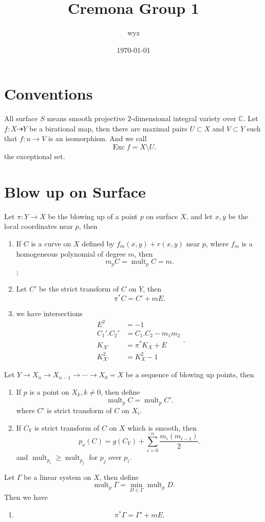 \documentclass{article}
\title{Cremona Group 1}
\author{wyz}
\date{\today}
\begin{document}
  \maketitle
\section{Conventions}
All surface $S$ means smooth projective $2$-dimensional integral variety over $\mathbb{C}$. Let $f:X\dashrightarrow Y$ be a birational map, then there are maximal pairs $U\subset X $ and $V \subset Y$ such that $f:u\to V$ is an isomorphism. And we call
\[
  \operatorname{Exc}f=X\setminus U
.\]
the exceptional set.

\section{Blow up on Surface}
Let $\pi :Y\to X$ be the blowing up of a point $p$ on surface $X$, and let $x,y$ be the local coordinates near $p$, then
\begin{enumerate}
  \item If $C$ is a curve on $X$ defined by $f_m(x,y)+ r(x,y)$ near $p$, where $f_m$ is a homogeneous polynomial of degree $m$, then
    \[
      m_pC=\operatorname{mult}_pC=m
    .\];
  \item Let $C'$ be the strict transform of $C$ on $Y$, then
    \[
      \pi^*C=C'+mE
    .\]
  \item we have intersections
    \[
      \begin{aligned}
        E^2&=-1\\
        C_{1}'.C_{2}'&=C_{1}.C_{2}-m_{1}m_{2}\\
        K_{X'}&=\pi^*K_{X}+E\\
        K_{X'}^2&=K_{X}^2-1
      \end{aligned}
    .\]
\end{enumerate}
Let $Y\to X_n\to X_{n-1}\to \cdots \to X_{0}=X$ be a sequence of blowing up points, then
\begin{enumerate}
  \item If $p$ is a point on $X_{k},k\neq 0$, then define
    \[
      \operatorname{mult}_pC=\operatorname{mult}_pC'
    .\]
    where $C'$ is strict transform of $C$ on $X_i$.
  \item If $C_Y$ is strict transform of $C$ on $X$ which is smooth, then
    \[
      p_a(C)=g(C_Y)+ \sum^{n}_{i=0} \frac{m_{i}(m_{i-1})}{2}  
    .\]
  and $\operatorname{mult}_{p_{i}}\geqslant \operatorname{mult}_{p_{j}}$ for $p_{j}$ over $p_{i}$.
\end{enumerate}
Let $\Gamma$ be a linear system on $X$, then define
\[
  \operatorname{mult}_p\Gamma=\min_{D \in \Gamma}\operatorname{mult}_pD 
.\]
Then we have 
\begin{enumerate}
  \item 
    \[
      \pi^*\Gamma=\Gamma'+mE
    .\]
\end{enumerate}
\end{document}

